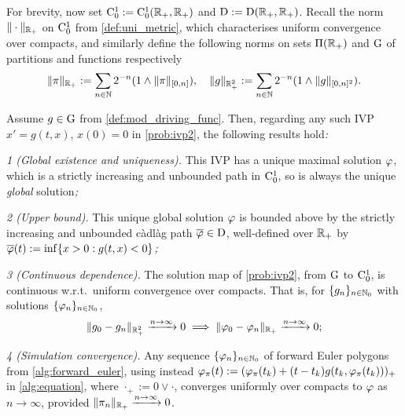 For brevity, now set $\mathrm{C}^1_0:=\mathrm{C}^1_0(\mathbb{R}_+,\mathbb{R}_+)$ and $\mathrm{D}:=\mathrm{D}(\mathbb{R}_+,\mathbb{R}_+)$. Recall the norm $\Vert\cdot\Vert_{\mathbb{R}_+}$ on $\mathrm{C}^1_0$ from \autoref{def:uni_metric}, which characterises uniform convergence over compacts, and similarly define the following norms on sets $\Pi(\mathbb{R}_+)$ and $\mathrm{G}$ of partitions and functions respectively
\begin{equation}
    \Vert \pi \Vert_{\mathbb{R}_+} := \sum_{n\in\mathbb{N}} 2^{-n}(1\wedge \Vert \pi \Vert_{[0,n]}),\quad \Vert g \Vert_{\mathbb{R}_+^2}:= \sum_{n\in\mathbb{N}} 2^{-n}(1\wedge \Vert g \Vert_{[0,n]^2}).
\end{equation}

\begin{theorem}\label{thm:wellposed}
    Assume $g\in\mathrm{G}$ from \autoref{def:mod_driving_func}. Then, regarding any such IVP $x'=g(t,x)$, $x(0)=0$ in \autoref{prob:ivp2}, the following results hold\emph{:}

    \emph{1 (Global existence and uniqueness).} This IVP has a unique maximal solution $\varphi$, which is a strictly increasing and unbounded path in $\mathrm{C}^1_0$, so is always the unique \emph{global} solution\emph{;}

    \emph{2 (Upper bound).} This unique global solution $\varphi$ is bounded above by the strictly increasing and unbounded c\`adl\`ag path $\overline{\varphi}\in\mathrm{D}$, well-defined over $\mathbb{R}_+$ by $\overline{\varphi}(t):=\inf\{x>0:g(t,x)<0\}$\emph{;}

    \emph{3 (Continuous dependence).} The solution map of \autoref{prob:ivp2}, from $\mathrm{G}$ to $\mathrm{C}^1_0$, is continuous w.r.t.~uniform convergence over compacts. That is, for $\{g_n\}_{n\in\mathbb{N}_0}$ with solutions $\{\varphi_n\}_{n\in\mathbb{N}_0}$,
    \begin{equation}\label{eq:new_cont_statement}
        \Vert g_0-g_n\Vert_{\mathbb{R}_+^2}\xrightarrow{n\to\infty}0 \implies \Vert \varphi_0-\varphi_n\Vert_{\mathbb{R}_+}\xrightarrow{n\to\infty}0;
    \end{equation}

    \emph{4 (Simulation convergence).} Any sequence $\{\varphi_n\}_{n\in\mathbb{N}_0}$ of forward Euler polygons from \autoref{alg:forward_euler}, using instead $\varphi_\pi(t) := (\varphi_\pi(t_k) + (t-t_k) g(t_k,\varphi_\pi(t_k)))_+$ in \autoref{alg:equation}, where $\cdot_+:=0\vee \cdot$, converges uniformly over compacts to $\varphi$ as $n\to\infty$, provided $\Vert\pi_n\Vert_{\mathbb{R}_+}\xrightarrow{n\to\infty}0$.
\end{theorem}
